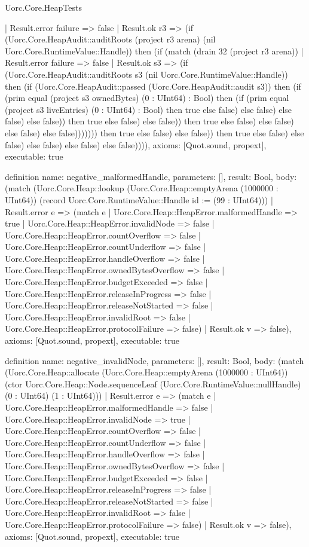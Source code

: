 \begin{lexlean}{Uorc.Core.HeapTests}
\begin{semanticmodule}
{                        | Result.error failure => false
                        | Result.ok r3 => (if (Uorc.Core.HeapAudit::auditRoots (project r3 arena) (nil Uorc.Core.RuntimeValue::Handle)) then (if (match (drain 32 (project r3 arena))
                          | Result.error failure => false
                          | Result.ok s3 => (if (Uorc.Core.HeapAudit::auditRoots s3 (nil Uorc.Core.RuntimeValue::Handle)) then (if (Uorc.Core.HeapAudit::passed (Uorc.Core.HeapAudit::audit s3)) then (if (prim equal (project s3 ownedBytes) (0 : UInt64) : Bool) then (if (prim equal (project s3 liveEntries) (0 : UInt64) : Bool) then true else false) else false) else false) else false)) then true else false) else false)) then true else false) else false) else false) else false))))))) then true else false) else false)) then true else false) else false) else false) else false) else false)))),
  axioms: [Quot.sound, propext],
  executable: true
}

definition{
  name: negative_malformedHandle,
  parameters: [],
  result: Bool,
  body: (match (Uorc.Core.Heap::lookup (Uorc.Core.Heap::emptyArena (1000000 : UInt64)) (record Uorc.Core.RuntimeValue::Handle {id := (99 : UInt64)}))
    | Result.error e => (match e
      | Uorc.Core.Heap::HeapError.malformedHandle => true
      | Uorc.Core.Heap::HeapError.invalidNode => false
      | Uorc.Core.Heap::HeapError.countOverflow => false
      | Uorc.Core.Heap::HeapError.countUnderflow => false
      | Uorc.Core.Heap::HeapError.handleOverflow => false
      | Uorc.Core.Heap::HeapError.ownedBytesOverflow => false
      | Uorc.Core.Heap::HeapError.budgetExceeded => false
      | Uorc.Core.Heap::HeapError.releaseInProgress => false
      | Uorc.Core.Heap::HeapError.releaseNotStarted => false
      | Uorc.Core.Heap::HeapError.invalidRoot => false
      | Uorc.Core.Heap::HeapError.protocolFailure => false)
    | Result.ok v => false),
  axioms: [Quot.sound, propext],
  executable: true
}

definition{
  name: negative_invalidNode,
  parameters: [],
  result: Bool,
  body: (match (Uorc.Core.Heap::allocate (Uorc.Core.Heap::emptyArena (1000000 : UInt64)) (ctor Uorc.Core.Heap::Node.sequenceLeaf (Uorc.Core.RuntimeValue::nullHandle) (0 : UInt64) (1 : UInt64)))
    | Result.error e => (match e
      | Uorc.Core.Heap::HeapError.malformedHandle => false
      | Uorc.Core.Heap::HeapError.invalidNode => true
      | Uorc.Core.Heap::HeapError.countOverflow => false
      | Uorc.Core.Heap::HeapError.countUnderflow => false
      | Uorc.Core.Heap::HeapError.handleOverflow => false
      | Uorc.Core.Heap::HeapError.ownedBytesOverflow => false
      | Uorc.Core.Heap::HeapError.budgetExceeded => false
      | Uorc.Core.Heap::HeapError.releaseInProgress => false
      | Uorc.Core.Heap::HeapError.releaseNotStarted => false
      | Uorc.Core.Heap::HeapError.invalidRoot => false
      | Uorc.Core.Heap::HeapError.protocolFailure => false)
    | Result.ok v => false),
  axioms: [Quot.sound, propext],
  executable: true
}


\end{semanticmodule}
\end{lexlean}
